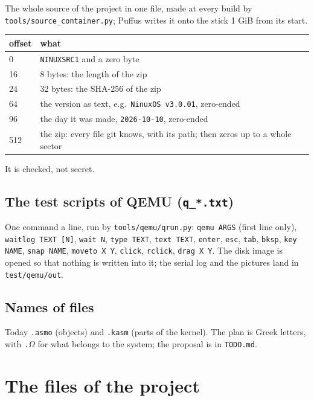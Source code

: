 \documentclass[11pt,a4paper]{article}
\newcommand{\file}[1]{\texttt{#1}}
\begin{document}
The whole source of the project in one file, made at every build by
\file{tools/source\_container.py}; Puffus writes it onto the stick 1 GiB from its start.

\begin{longtable}{@{}l p{12cm}@{}}
\toprule
offset & what \\ \midrule
0 & \texttt{NINUXSRC1} and a zero byte \\
16 & 8 bytes: the length of the zip \\
24 & 32 bytes: the SHA-256 of the zip \\
64 & the version as text, e.g.\ \texttt{NinuxOS v3.0.01}, zero-ended \\
96 & the day it was made, \texttt{2026-10-10}, zero-ended \\
512 & the zip: every file git knows, with its path; then zeros up to a whole sector \\
\bottomrule
\end{longtable}

\noindent It is checked, not secret.

\subsection{The test scripts of QEMU (\texttt{q\_*.txt})}

One command a line, run by \file{tools/qemu/qrun.py}: \texttt{qemu ARGS} (first line only),
\texttt{waitlog TEXT [N]}, \texttt{wait N}, \texttt{type TEXT}, \texttt{text TEXT}, \texttt{enter},
\texttt{esc}, \texttt{tab}, \texttt{bksp}, \texttt{key NAME}, \texttt{snap NAME}, \texttt{moveto X Y},
\texttt{click}, \texttt{rclick}, \texttt{drag X Y}. The disk image is opened so that nothing is
written into it; the serial log and the pictures land in \file{test/qemu/out}.

\subsection{Names of files}

Today \file{.asmo} (objects) and \file{.kasm} (parts of the kernel). The plan is Greek letters,
with \file{.$\Omega$} for what belongs to the system; the proposal is in \file{TODO.md}.

\section{The files of the project}
\end{document}
